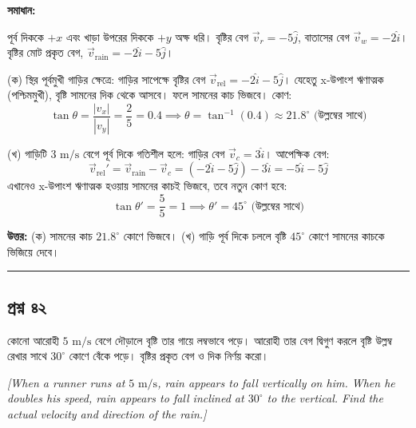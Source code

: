 \documentclass[11pt,a4paper]{article}
\begin{document}
\textbf{সমাধান:}

পূর্ব দিককে $+x$ এবং খাড়া উপরের দিককে $+y$ অক্ষ ধরি।
বৃষ্টির বেগ $\vec{v}_r = -5\hat{j}$, বাতাসের বেগ $\vec{v}_w = -2\hat{i}$।
বৃষ্টির মোট প্রকৃত বেগ, $\vec{v}_{\text{rain}} = -2\hat{i} - 5\hat{j}$।

(ক) স্থির পূর্বমুখী গাড়ির ক্ষেত্রে:
গাড়ির সাপেক্ষে বৃষ্টির বেগ $\vec{v}_{\text{rel}} = -2\hat{i} - 5\hat{j}$।
যেহেতু x-উপাংশ ঋণাত্মক (পশ্চিমমুখী), বৃষ্টি সামনের দিক থেকে আসবে। ফলে সামনের কাচ ভিজবে।
কোণ:
$$\tan\theta = \frac{|v_x|}{|v_y|} = \frac{2}{5} = 0.4 \implies \theta = \tan^{-1}(0.4) \approx 21.8^\circ\text{ (উল্লম্বের সাথে)}$$

(খ) গাড়িটি $3\text{ m/s}$ বেগে পূর্ব দিকে গতিশীল হলে:
গাড়ির বেগ $\vec{v}_c = 3\hat{i}$।
আপেক্ষিক বেগ:
$$\vec{v}_{\text{rel}}' = \vec{v}_{\text{rain}} - \vec{v}_c = (-2\hat{i} - 5\hat{j}) - 3\hat{i} = -5\hat{i} - 5\hat{j}$$
এখানেও x-উপাংশ ঋণাত্মক হওয়ায় সামনের কাচই ভিজবে, তবে নতুন কোণ হবে:
$$\tan\theta' = \frac{5}{5} = 1 \implies \theta' = 45^\circ\text{ (উল্লম্বের সাথে)}$$

\textbf{উত্তর:} (ক) সামনের কাচ $21.8^\circ$ কোণে ভিজবে। (খ) গাড়ি পূর্ব দিকে চললে বৃষ্টি $45^\circ$ কোণে সামনের কাচকে ভিজিয়ে দেবে।

\vspace{0.5cm}
\hrule
\vspace{0.5cm}

\subsection*{প্রশ্ন ৪২}

কোনো আরোহী $5\text{ m/s}$ বেগে দৌড়ালে বৃষ্টি তার গায়ে লম্বভাবে পড়ে। আরোহী তার বেগ দ্বিগুণ করলে বৃষ্টি উল্লম্ব রেখার সাথে $30^\circ$ কোণে বেঁকে পড়ে। বৃষ্টির প্রকৃত বেগ ও দিক নির্ণয় করো।

\smallskip
\textit{[When a runner runs at $5\text{ m/s}$, rain appears to fall vertically on him. When he doubles his speed, rain appears to fall inclined at $30^\circ$ to the vertical. Find the actual velocity and direction of the rain.]}

\vspace{0.3cm}
\begin{center}
\end{center}
\end{document}
